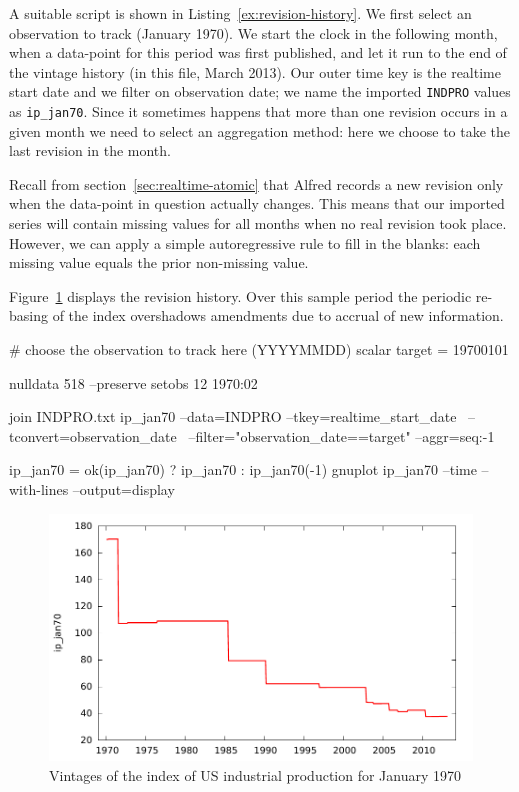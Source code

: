A suitable script is shown in Listing~\ref{ex:revision-history}.  We first
select an observation to track (January 1970). We start the clock in
the following month, when a data-point for this period was first
published, and let it run to the end of the vintage history (in this
file, March 2013).  Our outer time key is the realtime start date and
we filter on observation date; we name the imported \texttt{INDPRO}
values as \texttt{ip\_jan70}. Since it sometimes happens that more
than one revision occurs in a given month we need to select an
aggregation method: here we choose to take the last revision in the
month.

Recall from section~\ref{sec:realtime-atomic} that Alfred records a
new revision only when the data-point in question actually
changes. This means that our imported series will contain missing
values for all months when no real revision took place. However, we
can apply a simple autoregressive rule to fill in the blanks: each
missing value equals the prior non-missing value.

Figure~\ref{fig:realtime-revhist} displays the revision history. Over
this sample period the periodic re-basing of the index overshadows
amendments due to accrual of new information.

\begin{script}[htbp]
\begin{scode}
# choose the observation to track here (YYYYMMDD)
scalar target = 19700101

nulldata 518 --preserve
setobs 12 1970:02

join INDPRO.txt ip_jan70 --data=INDPRO --tkey=realtime_start_date \
--tconvert=observation_date \
--filter="observation_date==target" --aggr=seq:-1

ip_jan70 = ok(ip_jan70) ? ip_jan70 : ip_jan70(-1)
gnuplot ip_jan70 --time --with-lines --output=display
\end{scode}
\end{script}

\begin{figure}[htbp]
  \centering
\includegraphics[scale=0.75]{figures/revhist}
\caption{Vintages of the index of US industrial production for January
  1970}
  \label{fig:realtime-revhist}
\end{figure}

    

